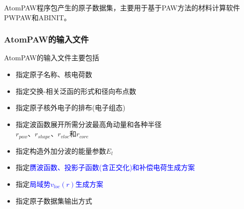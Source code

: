{{{	\textrm{AtomPAW}程序包产生的原子数据集，主要用于基于\textrm{PAW}方法的材料计算软件\textrm{PWPAW}和\textrm{ABINIT}。

}

\frame
{
	\frametitle{\textrm{AtomPAW}的输入文件}
\textrm{AtomPAW}的输入文件主要包括
\begin{itemize}
		\item 指定原子名称、核电荷数
	\item 指定交换-相关泛函的形式和径向布点数
		\item 指定原子核外电子的排布(电子组态)
		\item 指定波函数展开所需分波最高角动量和各种半径\\$r_{paw}$、$r_{shape}$、$r_{vloc}$和$r_{core}$
		\item 指定构造外加分波的能量参数$E_l$
		\item 指定\textcolor{blue}{赝波函数、投影子函数(含正交化)和补偿电荷生成方案}
		\item 指定\textcolor{blue}{局域势$v_{loc}(r)$生成方案}
		\item 指定原子数据集输出方式
	\end{itemize}
}

}}
